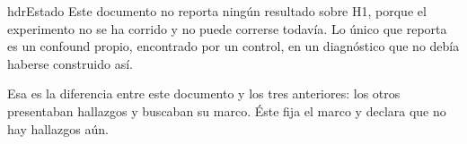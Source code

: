 \documentclass[11pt]{article}
\begin{document}
\vspace{0.4em}
\begin{cbox}{hdr}{Estado}
Este documento no reporta ningún resultado sobre H1, porque el experimento no se ha corrido y no puede correrse todavía. Lo único que reporta es un confound propio, encontrado por un control, en un diagnóstico que no debía haberse construido así.

\medskip
Esa es la diferencia entre este documento y los tres anteriores: los otros presentaban hallazgos y buscaban su marco. Éste fija el marco y declara que no hay hallazgos aún.
\end{cbox}
\end{document}
